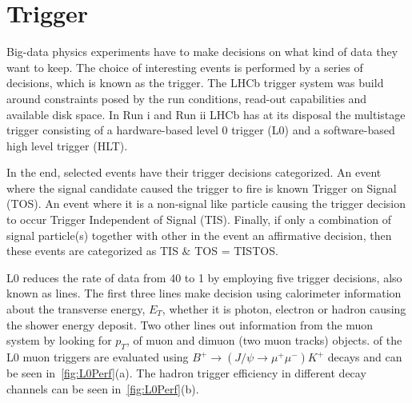 \section{Trigger }
\label{triggerchap}
Big-data physics experiments have to make decisions on what kind of data they want to keep. The choice of interesting events is performed by a series of decisions, which is known as the trigger. The \Gls{LHCb} trigger system was build around constraints posed by the run conditions, read-out capabilities and available disk space. In Run \Rn{1} and Run \Rn{2} \gls{LHCb} has at its disposal the multistage trigger consisting of a hardware-based level 0 trigger (\Gls{L0}) and a software-based high level trigger (\Gls{HLT}).

In the end, selected events have their trigger decisions categorized. An event where the signal candidate caused the trigger to fire is known \DIFdelbegin {}\DIFdelend \DIFaddbegin {}\DIFaddend Trigger on Signal (\Gls{TOS}). An event where it is a non-signal like particle causing the trigger decision to occur \DIFdelbegin \DIFdel{, }\DIFdelend \DIFaddbegin {}\DIFaddend Trigger Independent of Signal (\Gls{TIS})\DIFdelbegin {}\DIFdelend . Finally, if only \DIFdelbegin {}\DIFdelend a combination of signal particle(s) together with other \DIFdelbegin {}\DIFdelend \DIFaddbegin {}\DIFaddend in the event \DIFdelbegin {}\DIFdelend \DIFaddbegin {}\DIFaddend an affirmative decision, then these events are categorized as \Gls{TIS} $\&$ \Gls{TOS} = \Gls{TISTOS}.

\Gls{L0} reduces the rate of data from 40 \mhz to 1 \mhz by employing five trigger decisions, also known as lines. The first three lines make \DIFaddbegin {}\DIFaddend decision using calorimeter information about the transverse energy, $E_{T}$, \DIFaddbegin {}\DIFaddend whether it is \DIFaddbegin {}\DIFaddend photon, electron or hadron causing the shower energy deposit. Two other lines \DIFdelbegin {}\DIFdelend \DIFaddbegin {}\DIFaddend out information from the muon system by looking for  \DIFdelbegin {}\DIFdelend $p_{T}$, of muon and dimuon (two muon tracks) objects. \DIFdelbegin {}\DIFdelend \DIFaddbegin {}\DIFaddend of the L0 muon triggers are evaluated using $B^{+} \rightarrow (J/\psi \rightarrow \mu^{+} \mu^{-}) K^{+}$ decays and can be seen in~\autoref{fig:L0Perf}(a). The hadron trigger efficiency in different decay channels can be seen in~\autoref{fig:L0Perf}(b). 


